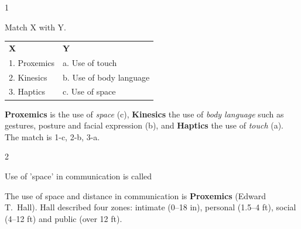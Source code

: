 \begin{question}{1}
{Match X with Y.\\[2pt]
\begin{tabular}{@{}ll@{}}
\textbf{X} & \textbf{Y}\\
1. Proxemics & a. Use of touch\\
2. Kinesics & b. Use of body language\\
3. Haptics & c. Use of space\\
\end{tabular}\par}
\begin{explain}
\textbf{Proxemics} is the use of \emph{space} (c), \textbf{Kinesics} the use of \emph{body language} such as gestures, posture and facial expression (b), and \textbf{Haptics} the use of \emph{touch} (a). The match is 1-c, 2-b, 3-a.
\end{explain}
\end{question}

\begin{question}{2}
{Use of 'space' in communication is called\par}
\begin{explain}
The use of space and distance in communication is \textbf{Proxemics} (Edward T.~Hall). Hall described four zones: intimate (0--18 in), personal (1.5--4 ft), social (4--12 ft) and public (over 12 ft).
\end{explain}
\end{question}

